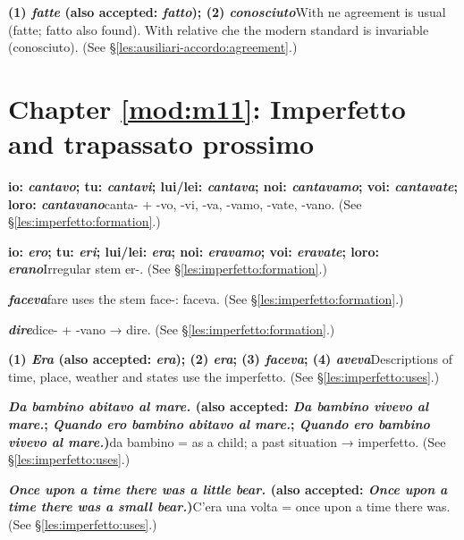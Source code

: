 \documentclass[11pt,a4paper,twoside,openright]{book}
\newcommand{\answerheading}[1]{\par\medskip\noindent{\sffamily\bfseries\small #1}\par\nopagebreak}
\begin{document}
\begin{answers}
\item\relax \textbf{(1) \textit{fatte} {\color{muted}(also accepted: \textit{fatto})}; (2) \textit{conosciuto}}\newline With ne agreement is usual (fatte; fatto also found). With relative che the modern standard is invariable (conosciuto). {\color{muted}(See \S\ref{les:ausiliari-accordo:agreement}.)}
\end{answers}

\section*{Chapter \ref{mod:m11}: Imperfetto and trapassato prossimo}

\answerheading{\S\ref{les:imperfetto} The imperfetto}\label{ans:imperfetto}
\begin{answers}
\item\relax \textbf{io: \textit{cantavo}; tu: \textit{cantavi}; lui/lei: \textit{cantava}; noi: \textit{cantavamo}; voi: \textit{cantavate}; loro: \textit{cantavano}}\newline canta- + -vo, -vi, -va, -vamo, -vate, -vano. {\color{muted}(See \S\ref{les:imperfetto:formation}.)}
\item\relax \textbf{io: \textit{ero}; tu: \textit{eri}; lui/lei: \textit{era}; noi: \textit{eravamo}; voi: \textit{eravate}; loro: \textit{erano}}\newline Irregular stem er-. {\color{muted}(See \S\ref{les:imperfetto:formation}.)}
\item\relax \textbf{\textit{faceva}}\newline fare uses the stem face-: faceva. {\color{muted}(See \S\ref{les:imperfetto:formation}.)}
\item\relax \textbf{\textit{dire}}\newline dice- + -vano → dire. {\color{muted}(See \S\ref{les:imperfetto:formation}.)}
\item\relax \textbf{(1) \textit{Era} {\color{muted}(also accepted: \textit{era})}; (2) \textit{era}; (3) \textit{faceva}; (4) \textit{aveva}}\newline Descriptions of time, place, weather and states use the imperfetto. {\color{muted}(See \S\ref{les:imperfetto:uses}.)}
\item\relax \textbf{\textit{Da bambino abitavo al mare.} {\color{muted}(also accepted: \textit{Da bambino vivevo al mare.}; \textit{Quando ero bambino abitavo al mare.}; \textit{Quando ero bambino vivevo al mare.})}}\newline da bambino = as a child; a past situation → imperfetto. {\color{muted}(See \S\ref{les:imperfetto:uses}.)}
\item\relax \textbf{\textit{Once upon a time there was a little bear.} {\color{muted}(also accepted: \textit{Once upon a time there was a small bear.})}}\newline C'era una volta = once upon a time there was. {\color{muted}(See \S\ref{les:imperfetto:uses}.)}
\end{answers}
\end{document}
